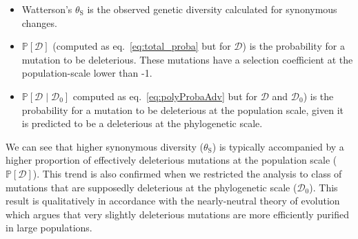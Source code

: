 \documentclass[12pt]{article}
\newcommand{\proba}{\mathbb{P}}
\newcommand{\SphyDel}{\mathcal{D}_0}
\newcommand{\given}{\mid}
\newcommand{\SpopDel}{\mathcal{D}}
\newcommand{\thetaSyn}{\theta_{\text{S}}}
\begin{document}
    \begin{itemize}
        \item Watterson's $\thetaSyn$ is the observed genetic diversity calculated for synonymous changes.
        \item $\proba [ \SpopDel ]$ (computed as eq.~\ref{eq:total_proba} but for $\SpopDel$)  is the probability for a mutation to be deleterious.
        These mutations have a selection coefficient at the population-scale lower than -1.
        \item $\proba [ \SpopDel \given \SphyDel ]$ computed as eq.~\ref{eq:polyProbaAdv} but for $\SpopDel$ and $\SphyDel$) is the probability for a mutation to be deleterious at the population scale, given it is predicted to be a deleterious at the phylogenetic scale.
    \end{itemize}

    We can see that higher synonymous diversity ($\thetaSyn$) is typically accompanied by a higher proportion of effectively deleterious mutations at the population scale ($\proba [ \SpopDel ]$).
    This trend is also confirmed when we restricted the analysis to class of mutations that are supposedly deleterious at the phylogenetic scale ($\SphyDel$).
    This result is qualitatively in accordance with the nearly-neutral theory of evolution which argues that very slightly deleterious mutations are more efficiently purified in large populations.
\end{document}
